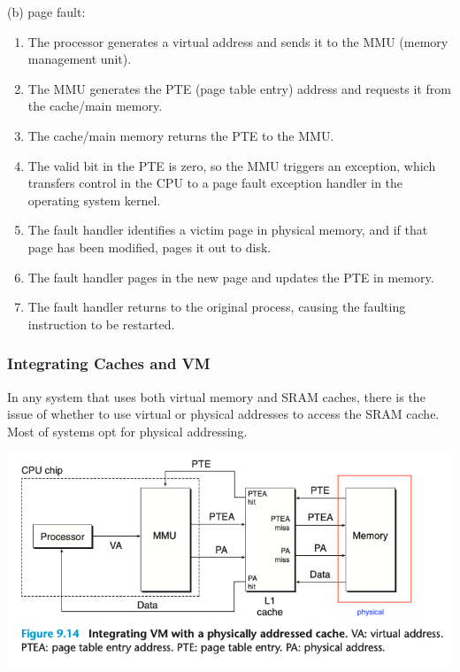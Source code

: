 \documentclass[11pt]{article}
\begin{document}
(b) page fault:\\
\begin{enumerate}
\item The processor generates a virtual address and sends it to the MMU (memory management unit).\\
\item The MMU generates the PTE (page table entry) address and requests it from the cache/main memory.\\
\item The cache/main memory returns the PTE to the MMU.\\
\item The valid bit in the PTE is zero, so the MMU triggers an exception, which transfers control in the CPU to a page fault exception handler in the operating system kernel.\\
\item The fault handler identifies a victim page in physical memory, and if that page has been modified, pages it out to disk.\\
\item The fault handler pages in the new page and updates the PTE in memory.\\
\item The fault handler returns to the original process, causing the faulting instruction to be restarted.\\
\end{enumerate}



\subsubsection{Integrating Caches and VM}
\label{sec:org3f5673d}
In any system that uses both virtual memory and SRAM caches, there is the issue of whether to use virtual or physical addresses to access the SRAM cache. Most of systems opt for physical addressing.\\

\begin{center}
\includegraphics[width=.9\linewidth]{pics/figure9.14-integrating-cache-and-vm.png}
\end{center}
\end{document}
